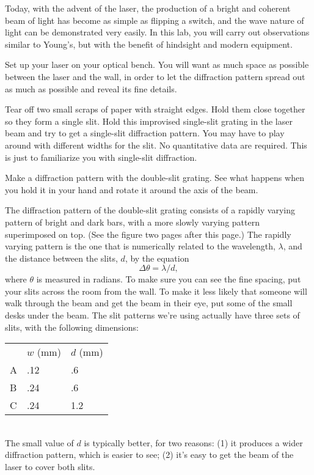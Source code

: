 Today, with the advent of the laser, the production of a
bright and coherent beam of light has become as simple as
flipping a switch, and the wave nature of light can be
demonstrated very easily. In this lab, you will carry out
observations similar to Young's, but with the benefit of
hindsight and modern equipment.

\observations




Set up your laser on your optical bench. You will want as
much space as possible between the laser and the wall, in
order to let the diffraction pattern spread out as much as
possible and reveal its fine details.

Tear off two small scraps of paper with straight edges. Hold
them close together so they form a single slit. Hold this
improvised single-slit grating in the laser beam and try to
get a single-slit diffraction pattern. You may have to play
around with different widths for the slit. No quantitative
data are required. This is just to familiarize you with
single-slit diffraction.

Make a diffraction pattern with the double-slit grating. See
what happens when you hold it in your hand and rotate it
around the axis of the beam.

The diffraction pattern of the double-slit grating consists
of a rapidly varying pattern of bright and dark bars, with a
more slowly varying pattern superimposed on top. (See the figure
two pages after this page.) The rapidly varying pattern is the one that is
numerically related to the wavelength, $\lambda $, and the
distance between the slits, $d$, by the equation
\begin{equation*}
         \Delta\theta =  \lambda /d  ,  
\end{equation*}
where $\theta $ is measured in radians. To make sure you can
see the fine spacing, put your slits across the room
from the wall. To make it less likely that
someone will walk through the beam and get the beam in their
eye, put some of the small desks under the beam.
The slit patterns we're using actually have three sets of
slits, with the following dimensions:\\
\begin{tabular}{lll}
    & $w$ (mm) & $d$ (mm) \\
A   & .12 & .6 \\
B   & .24 & .6 \\
C   & .24 & 1.2 
\end{tabular}\\
The small value of $d$ is typically better, for two reasons:
(1) it produces a wider diffraction pattern, which is easier
to see; (2) it's easy to get the beam of the laser to cover
both slits. 

